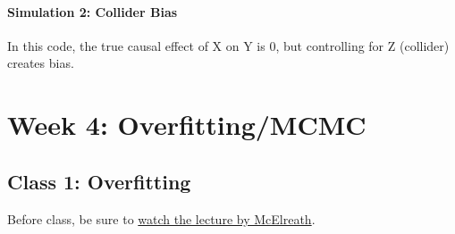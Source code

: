 \documentclass[
]{book}
\newenvironment{Shaded}{\begin{snugshade}}{\end{snugshade}}
\newcommand{\AttributeTok}[1]{\textcolor[rgb]{0.13,0.29,0.53}{#1}}
\newcommand{\DecValTok}[1]{\textcolor[rgb]{0.00,0.00,0.81}{#1}}
\newcommand{\FloatTok}[1]{\textcolor[rgb]{0.00,0.00,0.81}{#1}}
\newcommand{\FunctionTok}[1]{\textcolor[rgb]{0.13,0.29,0.53}{\textbf{#1}}}
\newcommand{\NormalTok}[1]{#1}
\newcommand{\OtherTok}[1]{\textcolor[rgb]{0.56,0.35,0.01}{#1}}
\newcommand{\SpecialCharTok}[1]{\textcolor[rgb]{0.81,0.36,0.00}{\textbf{#1}}}
\newcommand{\StringTok}[1]{\textcolor[rgb]{0.31,0.60,0.02}{#1}}
\begin{document}
\begin{Shaded}
\end{Shaded}

\subsubsection{Simulation 2: Collider Bias}\label{simulation-2-collider-bias}

In this code, the true causal effect of X on Y is 0, but controlling for Z (collider) creates bias.

\chapter{Week 4: Overfitting/MCMC}\label{week-4-overfittingmcmc}

\section{Class 1: Overfitting}\label{class-1-overfitting}

Before class, be sure to \href{https://www.youtube.com/watch?v=tNOu-SEacNU&list=PLDcUM9US4XdPz-KxHM4XHt7uUVGWWVSus&index=7}{watch the lecture by McElreath}.
\end{document}
